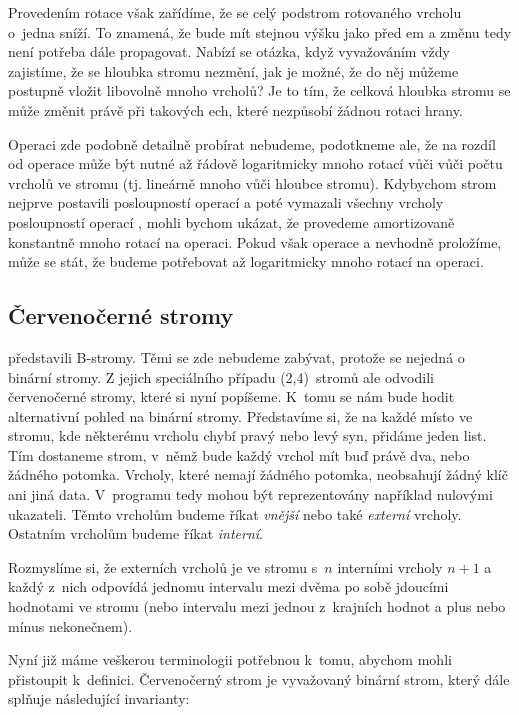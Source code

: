 Provedením rotace však zařídíme, že se celý podstrom rotovaného vrcholu o~jedna
sníží. To znamená, že bude mít stejnou výšku jako před em a změnu tedy
není potřeba dále propagovat. Nabízí se otázka, když vyvažováním vždy
zajistíme, že se hloubka stromu nezmění, jak je možné, že do něj můžeme
postupně vložit libovolně mnoho vrcholů? Je to tím, že celková hloubka stromu
se může změnit právě při takových ech, které nezpůsobí žádnou
rotaci hrany.

Operaci  zde podobně detailně probírat nebudeme, podotkneme ale, že na rozdíl od operace  může být nutné až řádově logaritmicky mnoho rotací vůči vůči počtu vrcholů ve stromu (tj. lineárně mnoho vůči hloubce stromu). Kdybychom strom nejprve postavili posloupností operací  a poté vymazali všechny vrcholy posloupností operací , mohli bychom ukázat, že provedeme amortizovaně konstantně mnoho rotací na operaci. Pokud však operace  a  nevhodně proložíme, může se stát, že budeme potřebovat až logaritmicky mnoho rotací na operaci.



\subsection{Červenočerné stromy}\label{sec:RB}

\citet{btrees} představili B-stromy. Těmi se zde nebudeme zabývat, protože se nejedná o binární stromy. Z jejich speciálního případu (2,4)~stromů ale \citet{redblack} odvodili červenočerné stromy, které si nyní popíšeme. K~tomu se nám bude hodit alternativní pohled na binární stromy.
Představíme si, že na každé místo ve stromu, kde některému vrcholu chybí pravý nebo levý syn, přidáme jeden list.
Tím dostaneme strom, v~němž bude každý vrchol mít buď právě dva, nebo
žádného potomka. Vrcholy, které nemají žádného potomka, neobsahují žádný klíč
ani jiná data. V~programu tedy mohou být reprezentovány například nulovými
ukazateli. Těmto vrcholům budeme říkat \emph{vnější} nebo také \emph{externí}
vrcholy. Ostatním vrcholům budeme říkat \emph{interní}.

Rozmyslíme si, že externích vrcholů je ve stromu s~$n$ 
interními vrcholy $n+1$ a každý z~nich odpovídá jednomu intervalu mezi dvěma po sobě
jdoucími hodnotami ve stromu (nebo intervalu mezi jednou z~krajních hodnot a
plus nebo mínus nekonečnem).

Nyní již máme veškerou terminologii potřebnou k~tomu, abychom mohli přistoupit k~definici. Červenočerný strom je vyvažovaný binární strom, který dále splňuje následující invarianty:

